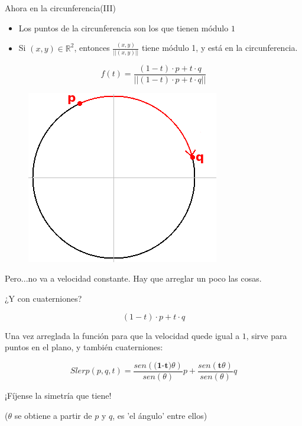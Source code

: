 \documentclass[10pt]{beamer}
\def\R{\mathbb{R}}
\begin{document}
\begin{frame}{Ahora en la circunferencia(III)}

\begin{itemize}
	\item Los puntos de la circunferencia son los que tienen módulo $1$
	\item Si $(x,y) \in \R^2$, entonces $\frac{(x,y)}{||(x,y)||}$ tiene módulo 1, y está en la circunferencia.
\end{itemize}

$$f(t) = \frac{(1-t) \cdot p + t\cdot q}{||(1-t)\cdot p+ t\cdot q||}$$

\begin{figure}
  	\centering
	\includegraphics[scale=0.44]{slerpR2_3_p.png}
\end{figure}

Pero...no va a velocidad constante. Hay que arreglar un poco las cosas.

\end{frame}

\begin{frame}{¿Y con cuaterniones?}



$$(1-t) \cdot p + t \cdot q$$

Una vez arreglada la función para que la velocidad quede igual a $1$, sirve para puntos en el plano, y también cuaterniones:

$$Slerp(p,q,t) = \frac{sen(\textbf{(1-t)}\theta)}{sen(\theta)} p + \frac{sen(\textbf{t}\theta)}{sen(\theta)} q$$ 

¡Fíjense la simetría que tiene!


($\theta$ se obtiene a partir de $p$ y $q$, es 'el ángulo' entre ellos)


\end{frame}
\end{document}

